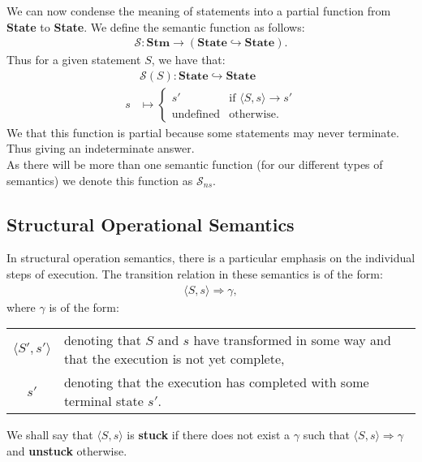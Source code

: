 We can now condense the meaning of statements into a partial
function from \textbf{State} to \textbf{State}. We define the semantic
function as follows: \begin{gather*}
  \mathcal{S}: \textbf{Stm} \to (\textbf{State} \hookrightarrow \textbf{State}).
\end{gather*} Thus for a given statement $S$, we have that: \begin{align*}
  &\mathcal{S}(S) : \textbf{State} \hookrightarrow \textbf{State} \\
  s &\mapsto \begin{cases}
    s' & \text{if } \langle S, s \rangle \to s' \\
    \text{undefined} & \text{otherwise}.
  \end{cases}
\end{align*} We that this function is partial because some statements
may never terminate. Thus giving an indeterminate answer.
\\[\baselineskip]
As there will be more than one semantic function (for our different types
of semantics) we denote this function as $\mathcal{S}_{ns}$.

\subsection{Structural Operational Semantics}

In structural operation semantics, there is a particular emphasis
on the individual steps of execution. The transition relation in
these semantics is of the form: \begin{gather*}
  \langle S, s \rangle \Rightarrow \gamma,
\end{gather*} where $\gamma$ is of the form:
\begin{center}
\renewcommand{\arraystretch}{1.5}
\begin{tabular}{ | c || p{8.5cm} | }
  \hline
  $\langle S', s' \rangle$ & denoting that $S$ and $s$
  have transformed in some way and that the execution is not
  yet complete, \\
  $s'$ & denoting that the execution has completed with some 
  terminal state $s'$. \\
  \hline
\end{tabular}
\end{center}

\noindent
We shall say that $\langle S, s \rangle$ is \textbf{stuck} if there
does not exist a $\gamma$ such that $\langle S, s \rangle
\Rightarrow \gamma$ and \textbf{unstuck} otherwise. 

